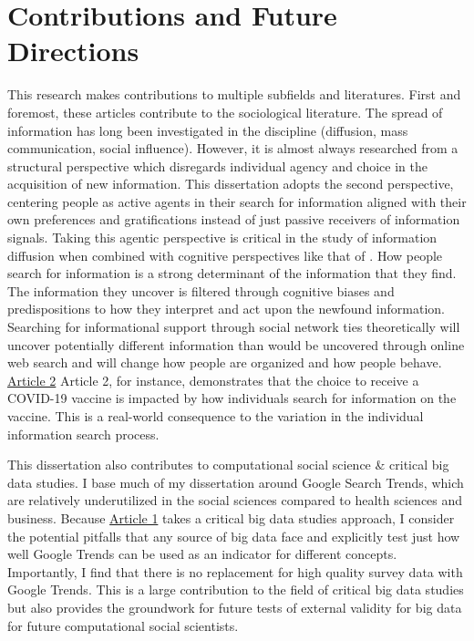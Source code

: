 \section{Contributions and Future Directions}

This research makes contributions to multiple subfields and literatures. 
First and foremost, these articles contribute to the sociological literature.
The spread of information has long been investigated in the discipline (diffusion, mass
communication, social influence). However, it is almost always researched from a structural
perspective which disregards individual agency and choice in the
acquisition of new information. This dissertation adopts the second perspective,
centering people as active agents in their search for information aligned
with their own preferences and gratifications instead of just
passive receivers of information signals.
Taking this agentic perspective is critical in the study of information
diffusion when combined with cognitive perspectives like that of
\citet{goldbergSocialContagionAssociative2018}. How people
search for information is a strong determinant of 
the information that they find. The information they uncover is filtered
through cognitive biases and predispositions to how they interpret and
act upon the newfound information. Searching for informational support
through social network ties theoretically will uncover potentially
different information than would be uncovered through online web
search and will change how people are organized and how people behave.
\hyperlink{paper-2}{Article 2} Article 2, for instance, demonstrates that 
the choice to receive a COVID-19 vaccine is impacted by how
individuals search for information on the vaccine. 
This is a real-world consequence to the variation in the individual information
search process.

This dissertation also contributes to computational social science \&
critical big data studies. I base much of my dissertation around Google
Search Trends, which are relatively underutilized in the social sciences
compared to health sciences and business. Because \hyperlink{paper-1}{Article 1} 
takes a critical big data studies approach, I consider the potential
pitfalls that any source of big data face \citep{mcfarlandBigDataDanger2015} and explicitly
test just how well Google Trends can be used as an indicator for different concepts. 
Importantly, I find that there is no replacement for high quality survey data with Google Trends. 
This is a large contribution to the field of critical big data studies but also provides
the groundwork for future tests of external validity for big data for future computational
social scientists.

